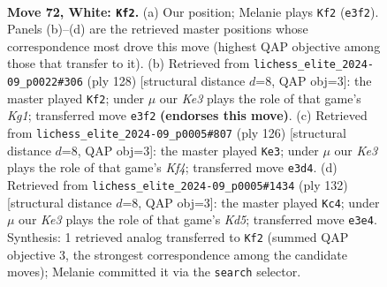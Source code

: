 \documentclass[11pt]{article}
\begin{document}
\clearpage

\begin{figure}[p]\centering
\begin{subfigure}{0.46\textwidth}\centering
\resizebox{\linewidth}{!}{%
\newchessgame
\chessboard[
  setfen={8/8/8/1k6/8/R2NK3/6Pr/8 w - - 8 72},
  showmover=false,
  pgfstyle=straightmove, color=movearrow, markmove={e3-f2}
]}
\caption{}
\end{subfigure}\hfill
\begin{subfigure}{0.46\textwidth}\centering
\resizebox{\linewidth}{!}{%
\newchessgame
\chessboard[
  setfen={7R/8/8/4r3/7P/7k/8/6KN w - - 27 65},
  showmover=false,
  pgfstyle=straightmove, color=movearrow, markmove={g1-f2}
]}
\caption{}
\end{subfigure}
\\[4pt]
\begin{subfigure}{0.46\textwidth}\centering
\resizebox{\linewidth}{!}{%
\newchessgame
\chessboard[
  setfen={8/6k1/R7/6N1/1r3K2/8/8/8 w - - 31 64},
  showmover=false,
  pgfstyle=straightmove, color=movearrow, markmove={f4-e3}
]}
\caption{}
\end{subfigure}\hfill
\begin{subfigure}{0.46\textwidth}\centering
\resizebox{\linewidth}{!}{%
\newchessgame
\chessboard[
  setfen={8/2k5/6R1/3K4/4N3/8/8/3r4 w - - 44 67},
  showmover=false,
  pgfstyle=straightmove, color=movearrow, markmove={d5-c4}
]}
\caption{}
\end{subfigure}
\caption{\textbf{Move 72, White: \texttt{Kf2}.} (a) Our position; Melanie plays \texttt{Kf2} (\texttt{e3f2}). Panels (b)--(d) are the retrieved master positions whose correspondence most drove this move (highest QAP objective among those that transfer to it). (b) Retrieved from \texttt{lichess\_elite\_2024-09\_p0022\#306} (ply 128) [structural distance $d$=8, QAP obj=3]: the master played \texttt{Kf2}; under $\mu$ our \emph{Ke3} plays the role of that game's \emph{Kg1}; transferred move \texttt{e3f2} \textbf{(endorses this move)}. (c) Retrieved from \texttt{lichess\_elite\_2024-09\_p0005\#807} (ply 126) [structural distance $d$=8, QAP obj=3]: the master played \texttt{Ke3}; under $\mu$ our \emph{Ke3} plays the role of that game's \emph{Kf4}; transferred move \texttt{e3d4}. (d) Retrieved from \texttt{lichess\_elite\_2024-09\_p0005\#1434} (ply 132) [structural distance $d$=8, QAP obj=3]: the master played \texttt{Kc4}; under $\mu$ our \emph{Ke3} plays the role of that game's \emph{Kd5}; transferred move \texttt{e3e4}. Synthesis: 1 retrieved analog transferred to \texttt{Kf2} (summed QAP objective 3, the strongest correspondence among the candidate moves); Melanie committed it via the \texttt{search} selector.}
\label{fig:thought-m142}
\end{figure}
\end{document}
